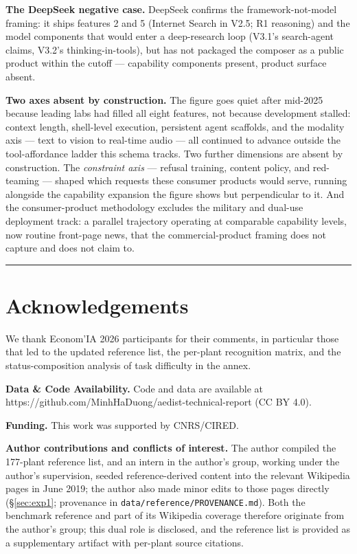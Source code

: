 \documentclass[a4paper,11pt]{article}
\begin{document}
\textbf{The DeepSeek negative case.} DeepSeek confirms the
framework-not-model framing: it ships features 2 and 5 (Internet Search
in V2.5; R1 reasoning) and the model components that would enter a
deep-research loop (V3.1's search-agent claims, V3.2's
thinking-in-tools), but has not packaged the composer as a public
product within the cutoff --- capability components present, product
surface absent.

\textbf{Two axes absent by construction.} The figure goes quiet after
mid-2025 because leading labs had filled all eight features, not because
development stalled: context length, shell-level execution, persistent
agent scaffolds, and the modality axis --- text to vision to real-time
audio --- all continued to advance outside the tool-affordance ladder
this schema tracks. Two further dimensions are absent by construction.
The \emph{constraint axis} --- refusal training, content policy, and
red-teaming --- shaped which requests these consumer products would
serve, running alongside the capability expansion the figure shows but
perpendicular to it. And the consumer-product methodology excludes the
military and dual-use deployment track: a parallel trajectory operating
at comparable capability levels, now routine front-page news, that the
commercial-product framing does not capture and does not claim to.

\begin{center}\rule{0.5\linewidth}{0.5pt}\end{center}

\section*{Acknowledgements}

We thank Econom'IA 2026 participants for their comments, in particular
those that led to the updated reference list, the per-plant recognition
matrix, and the status-composition analysis of task difficulty in the
annex.

\textbf{Data \& Code Availability.} Code and data are available at
https://github.com/MinhHaDuong/aedist-technical-report (CC BY 4.0).

\textbf{Funding.} This work was supported by CNRS/CIRED.

\textbf{Author contributions and conflicts of interest.} The author
compiled the 177-plant reference list, and an intern in the author's
group, working under the author's supervision, seeded reference-derived
content into the relevant Wikipedia pages in June 2019; the author also
made minor edits to those pages directly (§\ref{sec:exp1}; provenance in
\texttt{data/reference/PROVENANCE.md}). Both the benchmark reference and
part of its Wikipedia coverage therefore originate from the author's
group; this dual role is disclosed, and the reference list is provided
as a supplementary artifact with per-plant source citations.

\renewcommand{\refname}{Bibliography}

\end{document}
